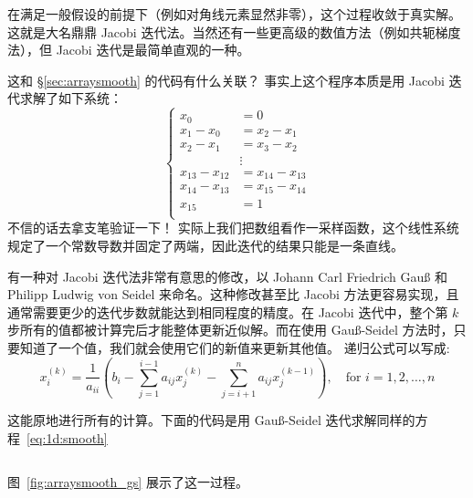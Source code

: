 \documentclass[notitlepage,oneside]{book}
\begin{document}
在满足一般假设的前提下（例如对角线元素显然非零），这个过程收敛于真实解。
这就是大名鼎鼎 Jacobi 迭代法。当然还有一些更高级的数值方法（例如共轭梯度法），但 Jacobi 迭代是最简单直观的一种。


这和 \S\ref{sec:arraysmooth} 的代码有什么关联？ 事实上这个程序本质是用 Jacobi 迭代求解了如下系统：
\begin{equation}
\label{eq:1d:smooth}
\left\{
\begin{array}{rl}
 x_0 &= 0 \\
x_1-x_0 &= x_2-x_1 \\
x_2-x_1 &= x_3-x_2 \\
     &  \vdots \\
x_{13}-x_{12}     &= x_{14}-x_{13} \\
x_{14}-x_{13}     &= x_{15}-x_{14} \\
x_{15} &= 1 \\
\end{array}
\right.
\end{equation}
不信的话去拿支笔验证一下！
实际上我们把数组看作一采样函数，这个线性系统规定了一个常数导数并固定了两端，因此迭代的结果只能是一条直线。

有一种对 Jacobi 迭代法非常有意思的修改，以 Johann Carl Friedrich Gauß 和 Philipp Ludwig von Seidel 来命名。这种修改甚至比 Jacobi 方法更容易实现，且通常需要更少的迭代步数就能达到相同程度的精度。在 Jacobi 迭代中，整个第 $k$ 步所有的值都被计算完后才能整体更新近似解。而在使用 Gauß-Seidel 方法时，只要知道了一个值，我们就会使用它们的新值来更新其他值。
递归公式可以写成:
$$
x_i^{(k)} = \frac{1}{a_{ii}} \left(b_i - \sum\limits_{j=1}^{i-1} a_{ij}x_j^{(k)} -  \sum\limits_{j=i+1}^n a_{ij}x_j^{(k-1)} \right), \quad \text{for } i=1,2,\dots,n
$$

这能原地进行所有的计算。下面的代码是用 Gauß-Seidel 迭代求解同样的方程~\eqref{eq:1d:smooth}

\inputminted[frame=single,linenos=true]{python}{listings/example_3.2.py}
图~\ref{fig:arraysmooth_gs} 展示了这一过程。
\end{document}
